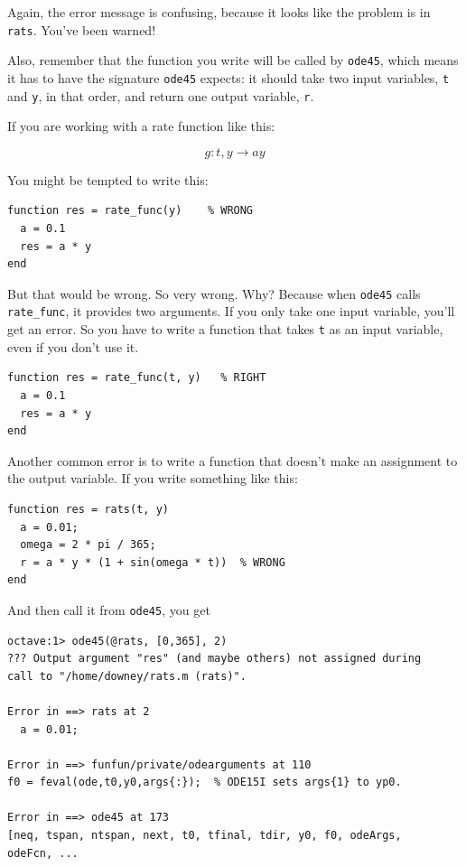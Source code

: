 \documentclass{book}
\begin{document}
Again, the error message is confusing, because it looks like the problem
is in {\tt rats}. You've been warned!

Also, remember that the function you write will be called by
{\tt ode45}, which means it has to have the signature {\tt ode45}
expects: it should take two input variables, {\tt t} and {\tt y},
in that order, and return one output variable, {\tt r}.

If you are working with a rate function like this:

\[ g : t, y \to a y \]

You might be tempted to write this:

\begin{verbatim}
function res = rate_func(y)    % WRONG
  a = 0.1
  res = a * y
end
\end{verbatim}

But that would be wrong. So very wrong. Why? Because
when {\tt ode45} calls {\tt rate\_func}, it provides two arguments.
If you only take one input variable, you'll get an error. So
you have to write a function that takes {\tt t} as an input
variable, even if you don't use it.

\begin{verbatim}
function res = rate_func(t, y)   % RIGHT
  a = 0.1
  res = a * y
end
\end{verbatim}

Another common error is to write a function that doesn't make
an assignment to the output variable. If you write something
like this:

\begin{verbatim}
function res = rats(t, y)
  a = 0.01;
  omega = 2 * pi / 365;
  r = a * y * (1 + sin(omega * t))  % WRONG
end
\end{verbatim}

And then call it from {\tt ode45}, you get

\begin{verbatim}
octave:1> ode45(@rats, [0,365], 2)
??? Output argument "res" (and maybe others) not assigned during 
call to "/home/downey/rats.m (rats)".

Error in ==> rats at 2
  a = 0.01;

Error in ==> funfun/private/odearguments at 110
f0 = feval(ode,t0,y0,args{:});  % ODE15I sets args{1} to yp0.

Error in ==> ode45 at 173
[neq, tspan, ntspan, next, t0, tfinal, tdir, y0, f0, odeArgs, 
odeFcn, ...
\end{verbatim}
\end{document}

